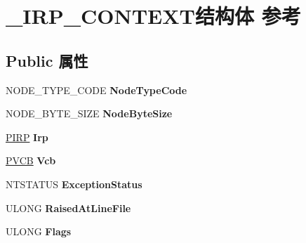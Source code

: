 \hypertarget{struct___i_r_p___c_o_n_t_e_x_t}{}\section{\+\_\+\+I\+R\+P\+\_\+\+C\+O\+N\+T\+E\+X\+T结构体 参考}
\label{struct___i_r_p___c_o_n_t_e_x_t}
\subsection*{Public 属性}
\begin{DoxyCompactItemize}
\item 
\mbox{\label{struct___i_r_p___c_o_n_t_e_x_t_a283c1051aaaa201c2ce330674e676743}} 
N\+O\+D\+E\+\_\+\+T\+Y\+P\+E\+\_\+\+C\+O\+DE {\bfseries Node\+Type\+Code}
\item 
\mbox{\label{struct___i_r_p___c_o_n_t_e_x_t_a51690b565d78f60ff1c39e3082fc3de1}} 
N\+O\+D\+E\+\_\+\+B\+Y\+T\+E\+\_\+\+S\+I\+ZE {\bfseries Node\+Byte\+Size}
\item 
\mbox{\label{struct___i_r_p___c_o_n_t_e_x_t_ac458a14509c64a7c16f1105b036b330b}} 
\hyperlink{interfacevoid}{P\+I\+RP} {\bfseries Irp}
\item 
\mbox{\label{struct___i_r_p___c_o_n_t_e_x_t_a13396da4cc780b67e15e8dc2e2061655}} 
\hyperlink{struct_d_e_v_i_c_e___e_x_t_e_n_s_i_o_n}{P\+V\+CB} {\bfseries Vcb}
\item 
\mbox{\label{struct___i_r_p___c_o_n_t_e_x_t_a1b96dbcc61a26ac0224076142fb17009}} 
N\+T\+S\+T\+A\+T\+US {\bfseries Exception\+Status}
\item 
\mbox{\label{struct___i_r_p___c_o_n_t_e_x_t_a4ca4dadb5c981cd19526cf40ff0a0a95}} 
U\+L\+O\+NG {\bfseries Raised\+At\+Line\+File}
\item 
\mbox{\label{struct___i_r_p___c_o_n_t_e_x_t_ababa3e00e4a66e0a683774b115326671}} 
U\+L\+O\+NG {\bfseries Flags}
\item 
\mbox{\label{struct___i_r_p___c_o_n_t_e_x_t_a450b894243b2bc90311724df3647d6a5}} 

\end{DoxyCompactItemize}
